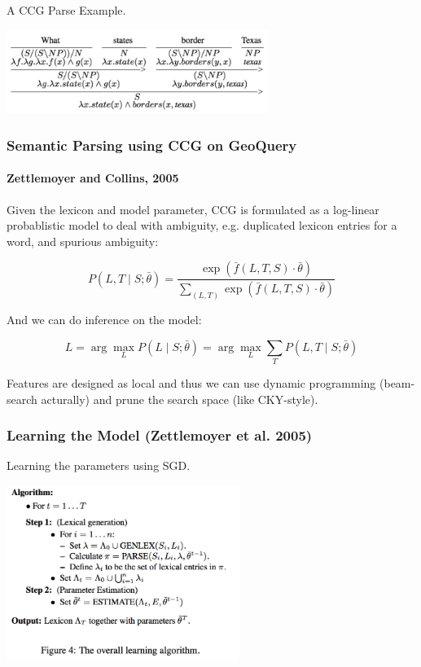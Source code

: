 \documentclass{beamer}
\begin{document}
\begin{frame}
{\begin{itemize}
        \end{itemize}
    }

     {
        A CCG Parse Example.

        \begin{center}
            \includegraphics[height=2.72cm,width=8.52cm]{img/ccg-parse.png}
        \end{center}
    }
\end{frame}

\begin{frame}
    \frametitle{Semantic Parsing using CCG on GeoQuery}
    \framesubtitle{Zettlemoyer and Collins, 2005}

    Given the lexicon and model parameter, CCG is formulated as a log-linear probablistic model
    to deal with ambiguity,
    e.g. duplicated lexicon entries for a word, and spurious ambiguity:

    \[
        P(L, T \mid S; \bar\theta) = \frac
            {\exp(\bar f(L,T,S)\cdot\bar\theta)}
            {\sum_{(L,T)}\exp(\bar f(L,T,S)\cdot\bar\theta)}
    \]

    And we can do inference on the model:

    \[
        L = \arg\max_L P(L\mid S;\bar\theta) = \arg\max_L\sum_TP(L,T\mid S;\bar\theta)
    \]

    Features are designed as local and thus we can use dynamic programming
    (beam-search acturally) and prune the search space (like CKY-style).

\end{frame}

\begin{frame}
    \frametitle{Learning the Model (Zettlemoyer et al. 2005)}

    Learning the parameters using SGD.

    \begin{center}
        \includegraphics[height=5.69cm,width=7.55cm]{img/learning-algo.png}
    \end{center}

\end{frame}
\end{document}
